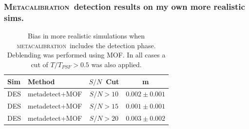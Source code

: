 \documentclass{beamer}
\newcommand{\mcal}{\textsc{metacalibration}}
\newcommand{\Mcal}{\textsc{Metacalibration}}
\newcommand{\snr}{$S/N$}
\begin{document}
\begin{frame}
    \frametitle{\Mcal\ detection results on my own more realistic sims.}

 
    \begin{table}
        \centering
        \begin{tabular}{|l|l|c|c|}
            \hline
            Sim & Method         & \snr\ Cut & m             \\
            \hline

            \hline
            {\color{green} DES} & metadetect+MOF    & \snr$ > 10$ & $0.002 \pm 0.001$  \\
            {\color{green} DES} & metadetect+MOF    & \snr$ > 15$ & $0.001 \pm 0.001$  \\
            {\color{green} DES} & metadetect+MOF    & \snr$ > 20$ & $0.003 \pm 0.002$  \\
            \hline

        \end{tabular}
        \caption{Bias in more realistic simulations when \mcal\ includes
            the detection phase.  Deblending was performed using MOF. 
            In all cases a cut of $T/T_{PSF} > 0.5$ was also applied.
        \label{tab:mcal:deblending}}
    \end{table}


\end{frame}
\end{document}

